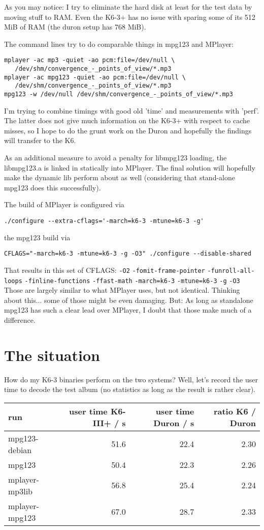 \documentclass[a4paper,12pt]{scrartcl}
\begin{document}
As you may notice: I try to eliminate the hard disk at least for the test data by moving stuff to RAM. Even the K6-3+ has no issue with sparing some of its 512 MiB of RAM (the duron setup has 768 MiB).

The command lines try to do comparable things in mpg123 and MPlayer:

\begin{verbatim}
mplayer -ac mp3 -quiet -ao pcm:file=/dev/null \
   /dev/shm/convergence_-_points_of_view/*.mp3
mplayer -ac mpg123 -quiet -ao pcm:file=/dev/null \
   /dev/shm/convergence_-_points_of_view/*.mp3
mpg123 -w /dev/null /dev/shm/convergence_-_points_of_view/*.mp3
\end{verbatim}

I'm trying to combine timings with good old 'time' and measurements with 'perf'. The latter does not give much information on the K6-3+ with respect to cache misses, so I hope to do the grunt work on the Duron and hopefully the findings will transfer to the K6.

As an additional measure to avoid a penalty for libmpg123 loading, the libmpg123.a is linked in statically into MPlayer. The final solution will hopefully make the dynamic lib perform about as well (considering that stand-alone mpg123 does this successfully).

The build of MPlayer is configured via
\begin{verbatim}
./configure --extra-cflags='-march=k6-3 -mtune=k6-3 -g'
\end{verbatim}
the mpg123 build via
\begin{verbatim}
CFLAGS="-march=k6-3 -mtune=k6-3 -g -O3" ./configure --disable-shared
\end{verbatim}

That results in this set of CFLAGS: \verb:-O2: \verb:-fomit-frame-pointer: \verb:-funroll-all-loops: \verb:-finline-functions: \verb:-ffast-math:  \verb:-march=k6-3: \verb:-mtune=k6-3: \verb:-g: \verb:-O3:
Those are largely similar to what MPlayer uses, but not identical. Thinking about this... some of those might be even damaging. But: As long as standalone mpg123 has such a clear lead over MPlayer, I doubt that those make much of a difference.


\section{The situation}

How do my K6-3 binaries perform on the two systems? Well, let's record the user time to decode the test album (no statistics as long as the result is rather clear).
\begin{center}
\begin{tabular}{lrrr}
run & user time K6-III+ / s & user time Duron / s & ratio K6 / Duron \\
\hline
mpg123-debian & 51.6 & 22.4 & 2.30 \\
mpg123 & 50.4 & 22.3 & 2.26 \\
mplayer-mp3lib & 56.8 & 25.4 & 2.24 \\
mplayer-mpg123 & 67.0 & 28.7 & 2.33
\end{tabular}
\end{center}
\end{document}
